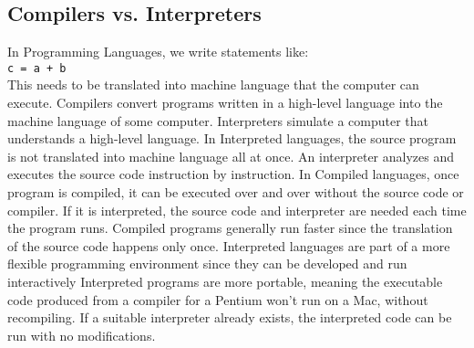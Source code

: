 \documentclass[12pt,a4paper,final,twoside,onecolumn,titlepage]{book}
\begin{document}
\subsection{Compilers vs. Interpreters}
In Programming Languages, we write statements like:\\
\texttt{c = a + b}\\
This needs to be translated into machine language that the computer can execute. Compilers convert programs written in a high-level language into the machine language of some computer. Interpreters simulate a computer that understands a high-level language. In Interpreted languages, the source program is not translated into machine language all at once. An interpreter analyzes and executes the source code instruction by instruction. In Compiled languages, once program is compiled, it can be executed over and over without the source code or compiler. If it is interpreted, the source code and interpreter are needed each time the program runs. Compiled programs generally run faster since the translation of the source code happens only once. Interpreted languages are part of a more flexible programming environment since they can be developed and run interactively
Interpreted programs are more portable, meaning the executable code produced from a compiler for a Pentium won’t run on a Mac, without recompiling. If a suitable interpreter already exists, the interpreted code can be run with no modifications.
\end{document}
